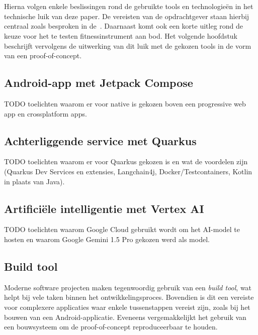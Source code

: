 
\chapter{}
\label{ch:shortlist}
Hierna volgen enkele beslissingen rond de gebruikte tools en technologie\"en in het technische luik van deze paper.
De vereisten van de opdrachtgever staan hierbij centraal zoals besproken in de~.
Daarnaast komt ook een korte uitleg rond de keuze voor het te testen fitnessinstrument aan bod.
Het volgende hoofdstuk beschrijft vervolgens de uitwerking van dit luik met de gekozen tools in de vorm van een proof-of-concept.

\section{Android-app met Jetpack Compose}
\label{sec:keuze-framework-voor-android-app}
TODO toelichten waarom er voor native is gekozen boven een progressive web app en crossplatform apps.

\section{Achterliggende service met Quarkus}
\label{sec:keuze-framework-voor-back-end}
TODO toelichten waarom er voor Quarkus gekozen is en wat de voordelen zijn (Quarkus Dev Services en extensies, Langchain4j, Docker/Testcontainers, Kotlin in plaats van Java).

\section{Artificiële intelligentie met Vertex AI}
\label{sec:keuze-ai-platform}
TODO toelichten waarom Google Cloud gebruikt wordt om het AI-model te hosten en waarom Google Gemini 1.5 Pro gekozen werd als model.

\section{Build tool}
\label{sec:build-tool}
Moderne software projecten maken tegenwoordig gebruik van een \textit{build tool}, wat helpt bij vele taken binnen het ontwikkelingsproces.
Bovendien is dit een vereiste voor complexere applicaties waar enkele tussenstappen vereist zijn, zoals bij het bouwen van een Android-applicatie.
Eveneens vergemakkelijkt het gebruik van een bouwsysteem om de proof-of-concept reproduceerbaar te houden.

